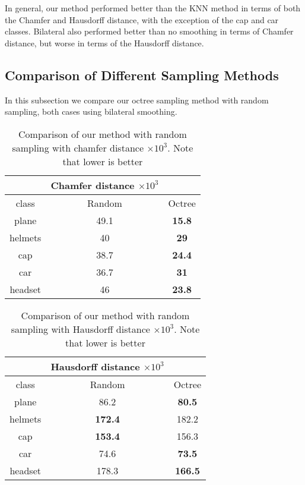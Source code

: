 In general, our method performed better than the KNN method in terms of both the Chamfer and Hausdorff distance, with the exception of the cap and car classes. 
Bilateral also performed better than no smoothing in terms of Chamfer distance, but worse in terms of the Hausdorff distance.

\subsection{Comparison of Different Sampling Methods}

In this subsection we compare our octree sampling method with random sampling, both cases using bilateral smoothing.

\begin{table}[H]
\centering
\begin{tabular}{ccc}
	& Chamfer distance $\times 10^3$ &\\
	\hline
	class & Random & Octree \\
	\hline
	plane & {49.1} & \textbf{15.8} \\ 
	helmets & {40} & \textbf{29} \\
	cap & {38.7} & \textbf{24.4} \\  
	car & {36.7} & \textbf{31} \\  
	headset & {46} & \textbf{23.8}  \\
\end{tabular}
\caption{Comparison of our method with random sampling with chamfer distance $\times 10^3$. Note that lower is better}
\end{table}

\begin{table}[H]
\centering
\begin{tabular}{ccc}
	& Hausdorff distance $\times 10^3$ &\\
	\hline
	class & Random & Octree \\
	\hline
	plane & 86.2 & \textbf{80.5} \\
	helmets & \textbf{172.4} &  {182.2}\\
cap & \textbf{153.4} & {156.3} \\
car & {74.6} & \textbf{73.5} \\
headset & 178.3 & \textbf{166.5} \\
\end{tabular}
\caption{Comparison of our method with random sampling with Hausdorff distance $\times 10^3$. Note that lower is better}
\end{table}

